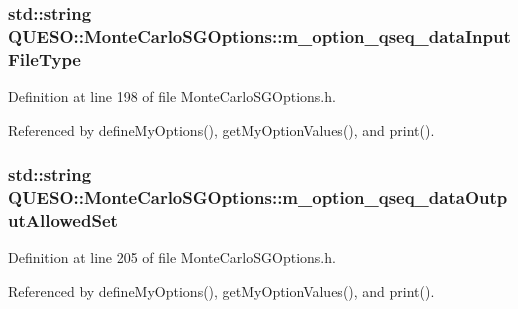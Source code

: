\hypertarget{class_q_u_e_s_o_1_1_monte_carlo_s_g_options_a93530ee50a7e47ad57b46ca6cf04a60c}{
\subsubsection[{m\-\_\-option\-\_\-qseq\-\_\-data\-Input\-File\-Type}]{\setlength{\rightskip}{0pt plus 5cm}std\-::string Q\-U\-E\-S\-O\-::\-Monte\-Carlo\-S\-G\-Options\-::m\-\_\-option\-\_\-qseq\-\_\-data\-Input\-File\-Type\hspace{0.3cm}{\ttfamily [private]}}}\label{class_q_u_e_s_o_1_1_monte_carlo_s_g_options_a93530ee50a7e47ad57b46ca6cf04a60c}


Definition at line 198 of file Monte\-Carlo\-S\-G\-Options.\-h.



Referenced by define\-My\-Options(), get\-My\-Option\-Values(), and print().

\hypertarget{class_q_u_e_s_o_1_1_monte_carlo_s_g_options_a2d464d948dabe4fd9fbd1e912537b3e0}{
\subsubsection[{m\-\_\-option\-\_\-qseq\-\_\-data\-Output\-Allowed\-Set}]{\setlength{\rightskip}{0pt plus 5cm}std\-::string Q\-U\-E\-S\-O\-::\-Monte\-Carlo\-S\-G\-Options\-::m\-\_\-option\-\_\-qseq\-\_\-data\-Output\-Allowed\-Set\hspace{0.3cm}{\ttfamily [private]}}}\label{class_q_u_e_s_o_1_1_monte_carlo_s_g_options_a2d464d948dabe4fd9fbd1e912537b3e0}


Definition at line 205 of file Monte\-Carlo\-S\-G\-Options.\-h.



Referenced by define\-My\-Options(), get\-My\-Option\-Values(), and print().

